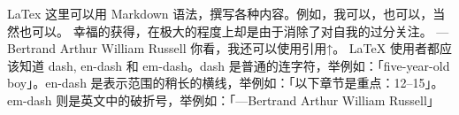\markdownRendererInterblockSeparator
{}\markdownRendererBackslash{}LaTex\markdownRendererBackslash{} 这里可以用 Markdown 语法，撰写各种内容。例如，我可以，也可以，当然也可以。\markdownRendererInterblockSeparator
{}\markdownRendererInterblockSeparator
{}\markdownRendererBlockQuoteBegin
幸福的获得，在极大的程度上却是由于消除了对自我的过分关注。 ---Bertrand Arthur William Russell
\markdownRendererBlockQuoteEnd \markdownRendererInterblockSeparator
{}你看，我还可以使用引用↑。\markdownRendererInterblockSeparator
{}\markdownRendererInterblockSeparator
{}LaTeX 使用者都应该知道 dash, en-dash 和 em-dash。dash 是普通的连字符，举例如：「five-year-old boy」。en-dash 是表示范围的稍长的横线，举例如：「以下章节是重点：12--15」。em-dash 则是英文中的破折号，举例如：「---Bertrand Arthur William Russell」\relax